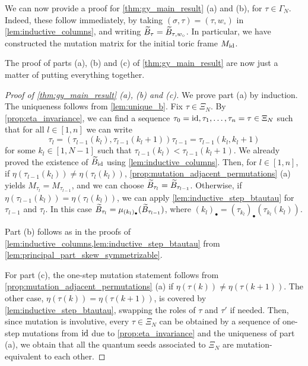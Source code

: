 We can now provide a proof for \cref{thm:gy_main_result} (a) and (b), for $\tau \in
	\Gamma_N$. Indeed, these follow immediately, by taking $(\sigma, \tau) = (\tau,
	w_\circ)$ in \cref{lem:inductive_columns}, and writing $\widetilde{B}_{\tau} = \widetilde{B}_{\tau,
		w_\circ}$. In particular, we have constructed the mutation matrix for the initial toric
frame $M_{\operatorname{id}}$.

The proof of parts (a), (b) and (c) of \cref{thm:gy_main_result} are now just a matter
of putting everything together.
\begin{proof}[Proof of \cref{thm:gy_main_result} (a), (b) and (c)]
	We prove part (a) by induction. The uniqueness follows from \cref{lem:unique_b}. Fix $\tau \in \Xi_N$. By \cref{prop:eta_invariance}, we can find a sequence $\tau_0 = \operatorname{id}, \tau_1, \dots, \tau_n = \tau \in \Xi_N$ such that for all $l \in [1, n]$ we can write
	\begin{equation*}
		\tau_l = (\tau_{l-1}(k_l), \tau_{l-1}(k_l + 1))\tau_{l-1} = \tau_{l-1}(k_l, k_l + 1)
	\end{equation*}
	for some $k_l \in [1, N-1]$ such that $\tau_{l-1}(k_l) < \tau_{l-1}(k_l + 1)$. We
	already proved the existence of $\widetilde{B}_{\operatorname{id}}$ using \cref{lem:inductive_columns}. Then,
	for $l \in [1, n]$, if $\eta(\tau_{l-1}(k_l)) \neq \eta(\tau_l(k_l))$,
	\cref{prop:mutation_adjacent_permutations} (a) yields $M_{\tau_l} = M_{\tau_{l-1}}$,
	and we can choose $\widetilde{B}_{\tau_l} = \widetilde{B}_{\tau_{l-1}}$. Otherwise, if
	$\eta(\tau_{l-1}(k_l)) = \eta(\tau_l(k_l))$, we can apply
	\cref{lem:inductive_step_btautau} for $\tau_{l-1}$ and $\tau_{l}$. In this case
	$\widetilde{B}_{\tau_l} = \mu_{(k_l)_\bullet}(\widetilde{B}_{\tau_{l-1}})$, where $(k_l)_\bullet =
		(\tau_{k_l})_\bullet(\tau_{k_l}(k_l))$.

	Part (b) follows as in the proofs of
	\cref{lem:inductive_columns,lem:inductive_step_btautau} from
	\cref{lem:principal_part_skew_symmetrizable}.

	For part (c), the one-step mutation statement follows from
	\cref{prop:mutation_adjacent_permutations} (a) if $\eta(\tau(k)) \neq \eta(\tau(k +
			1))$. The other case, $\eta(\tau(k)) = \eta(\tau(k+1))$, is covered by
	\cref{lem:inductive_step_btautau}, swapping the roles of $\tau$ and $\tau'$ if needed.
	Then, since mutation is involutive, every $\tau \in \Xi_N$ can be obtained by a
	sequence of one-step mutations from $\operatorname{id}$ due to \cref{prop:eta_invariance} and the
	uniqueness of part (a), we obtain that all the quantum seeds associated to $\Xi_N$ are
	mutation-equivalent to each other.
\end{proof}

